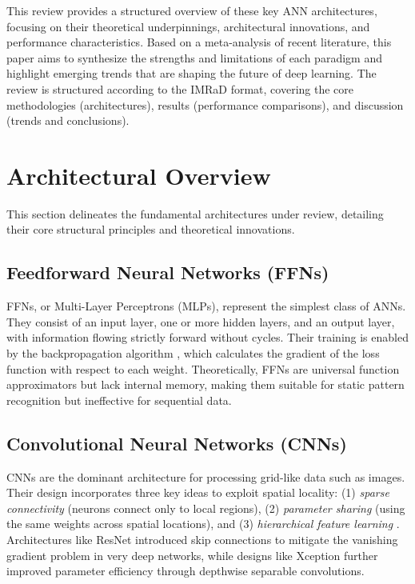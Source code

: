 \documentclass[10pt, conference]{IEEEtran}
\begin{document}
 This review provides a structured overview of these key ANN
 architectures, focusing on their theoretical underpinnings, architectural
 innovations, and performance characteristics. Based on a meta-analysis of
 recent literature, this paper aims to synthesize the strengths and
 limitations of each paradigm and highlight emerging trends that are
 shaping the future of deep learning. The review is structured according
 to the IMRaD format, covering the core methodologies (architectures),
 results (performance comparisons), and discussion (trends and
 conclusions).

\section{Architectural Overview}
\label{sec:methods}

 This section delineates the fundamental architectures under review,
 detailing their core structural principles and theoretical innovations.

\subsection{Feedforward Neural Networks (FFNs)}

 FFNs, or Multi-Layer Perceptrons (MLPs), represent the simplest class of
 ANNs. They consist of an input layer, one or more hidden layers, and an
 output layer, with information flowing strictly forward without cycles.
 Their training is enabled by the backpropagation algorithm
 \cite{rumelhart1986learning}, which calculates the gradient of the loss
 function with respect to each weight. Theoretically, FFNs are universal
 function approximators but lack internal memory, making them suitable for
 static pattern recognition but ineffective for sequential data.

\subsection{Convolutional Neural Networks (CNNs)}

 CNNs are the dominant architecture for processing grid-like data such as
 images. Their design incorporates three key ideas to exploit spatial
 locality: (1) \textit{sparse connectivity} (neurons connect only to local
 regions), (2) \textit{parameter sharing} (using the same weights across
 spatial locations), and (3) \textit{hierarchical feature learning}
 \cite{lecun2015deep}. Architectures like ResNet \cite{he2016deep}
 introduced skip connections to mitigate the vanishing gradient problem in
 very deep networks, while designs like Xception
 \cite{chollet2017xception} further improved parameter efficiency through
 depthwise separable convolutions.
\end{document}
